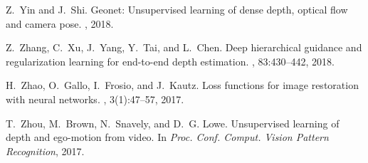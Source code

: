 \documentclass[10pt,twocolumn,letterpaper]{article}
\begin{document}
{\begin{thebibliography}{10}
Z.~Yin and J.~Shi.
\newblock Geonet: Unsupervised learning of dense depth, optical flow and camera
  pose.
, 2018.

Z.~Zhang, C.~Xu, J.~Yang, Y.~Tai, and L.~Chen.
\newblock Deep hierarchical guidance and regularization learning for end-to-end
  depth estimation.
, 83:430--442, 2018.

H.~Zhao, O.~Gallo, I.~Frosio, and J.~Kautz.
\newblock Loss functions for image restoration with neural networks.
, 3(1):47--57, 2017.

T.~Zhou, M.~Brown, N.~Snavely, and D.~G. Lowe.
\newblock Unsupervised learning of depth and ego-motion from video.
\newblock In {\em Proc. Conf. Comput. Vision Pattern Recognition}, 2017.

\end{thebibliography}

}
\end{document}
